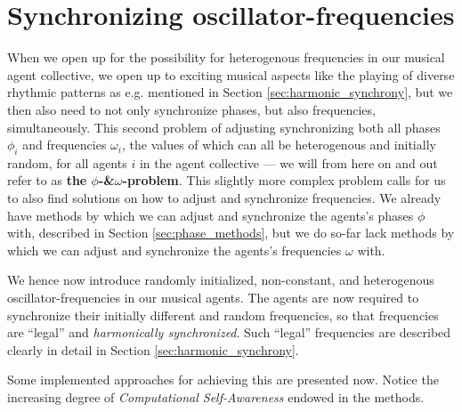 	
	
	










	

\section{Synchronizing oscillator-frequencies}
\label{sec:frequency_methods}


	When we open up for the possibility for heterogenous frequencies in our musical agent collective, we open up to exciting musical aspects like the playing of diverse rhythmic patterns as e.g. mentioned in Section \ref{sec:harmonic_synchrony}, but we then also need to not only synchronize phases, but also frequencies, simultaneously. This second problem of adjusting synchronizing both all phases $\phi_i$ and frequencies $\omega_i$, the values of which can all be heterogenous and initially random, for all agents $i$ in the agent collective — we will from here on and out refer to as \textbf{the $\phi$-\&$\omega$-problem}. This slightly more complex problem calls for us to also find solutions on how to adjust and synchronize frequencies. We already have methods by which we can adjust and synchronize the agents's phases $\phi$ with, described in Section \ref{sec:phase_methods}, but we do so-far lack methods by which we can adjust and synchronize the agents's frequencies $\omega$ with.
	
	We hence now introduce randomly initialized, non-constant, and heterogenous oscillator-frequencies in our musical agents. The agents are now required to synchronize their initially different and random frequencies, so that frequencies are ``legal'' and \textit{harmonically synchronized}. Such ``legal'' frequencies are described clearly in detail in Section \ref{sec:harmonic_synchrony}.
	
	Some implemented approaches for achieving this are presented now. Notice the increasing degree of \textit{Computational Self-Awareness} endowed in the methods.
	
